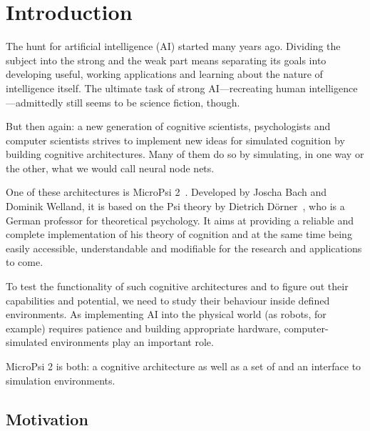 \chapter{Introduction}
\label{chap:1}


The hunt for artificial intelligence (AI) started many years ago. Dividing the subject into the strong and the weak part means separating its goals into developing useful, working applications and learning about the nature of intelligence itself. The ultimate task of strong AI---recreating human intelligence---admittedly still seems to be science fiction, though.


But then again: a new generation of cognitive scientists, psychologists and computer scientists strives to implement new ideas for simulated cognition by building cognitive architectures. Many of them do so by simulating, in one way or the other, what we would call neural node nets.

One of these architectures is MicroPsi 2~\cite{conf/agi/Bach12}. Developed by Joscha Bach and Dominik Welland, it is based on the Psi theory by Dietrich Dörner~\cite{Doerner98}, who is a German professor for theoretical psychology. It aims at providing a reliable and complete implementation of his theory of cognition and at the same time being easily accessible, understandable and modifiable for the research and applications to come.

To test the functionality of such cognitive architectures and to figure out their capabilities and potential, we need to study their behaviour inside defined environments. As implementing AI into the physical world (as robots, for example) requires patience and building appropriate hardware, computer-simulated environments play an important role.

MicroPsi 2 is both: a cognitive architecture as well as a set of and an interface to simulation environments.

\section{Motivation}


